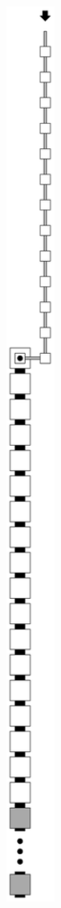 \begin{figure}[H]
\begin{subfigure}[t]{0.32\textwidth}
        \includegraphics[width=0.32\textwidth]{return_paths_return_from_digit_2_op-or-seed}

\end{subfigure}
\end{figure}
